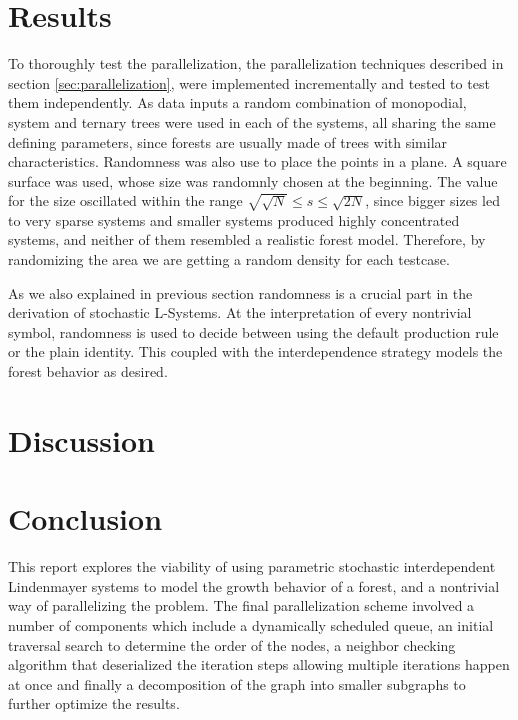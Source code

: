 \documentclass[letterpaper,twoside,11pt]{article}
\begin{document}
\begin{multicols}{2}


\section{Results} %
\label{sec:results}

To thoroughly test the parallelization, the parallelization techniques described in section \ref{sec:parallelization}, were implemented incrementally and tested to test them independently. As data inputs a random combination of monopodial, system and ternary trees were used in each of the systems, all sharing the same defining parameters, since forests are usually made of trees with similar characteristics. Randomness was also use to place the points in a plane. A square surface was used, whose size was randomnly chosen at the beginning. The value for the size oscillated within the range $\sqrt{\sqrt{N}} \leq s \leq \sqrt{2N}$, since bigger sizes led to very sparse systems and smaller systems produced highly concentrated systems,  and neither of them resembled a realistic forest model. Therefore, by randomizing the area we are getting a random density for each testcase.

As we also explained in previous section randomness is a crucial part in the derivation of stochastic L-Systems. At the interpretation of every nontrivial symbol, randomness is used to decide between using the default production rule or the plain identity. This coupled with the interdependence strategy models the forest behavior as desired.

\section{Discussion} %
\label{sec:discussion}

\section{Conclusion} %
\label{sec:conclusion}

This report explores the viability of using parametric stochastic interdependent Lindenmayer systems to model the growth behavior of a forest, and a nontrivial way of parallelizing the problem. The final parallelization scheme involved a number of components which include a dynamically scheduled queue, an initial traversal search to determine the order of the nodes, a neighbor checking algorithm that deserialized the iteration steps allowing multiple iterations happen at once and finally a decomposition of the graph into smaller subgraphs to further optimize the results.


\end{multicols}
\end{document}
